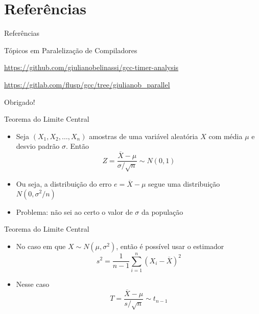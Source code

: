 \section{Referências}

\begin{frame}[allowframebreaks]{Referências}
  \printbibliography
\end{frame}

\begin{frame}{Tópicos em Paralelização de Compiladores}
  \overview

  {%
    \centering\noindent%
    \url{https://github.com/giulianobelinassi/gcc-timer-analysis}\par
    \url{https://gitlab.com/flusp/gcc/tree/giulianob\_parallel}\par
  }

\end{frame}

\begin{frame}[standout]
    Obrigado!
\end{frame}

\appendix

\begin{frame}{Teorema do Limite Central}
    \begin{itemize}
        \item Seja $(X_1, X_2, \dots, X_n)$ amostras de uma variável aleatória $X$ com média
            $\mu$ e desvio padrão $\sigma$. Então
            $$ Z = \frac{\overline{X} - \mu}{\sigma / \sqrt{n}} \sim N(0, 1)$$
        \item Ou seja, a distribuição do erro $e = \overline{X} - \mu$ segue uma distribuição $N(0, \sigma^2/n)$
        \item Problema: não sei ao certo o valor de $\sigma$ da população
    \end{itemize}
\end{frame}

\begin{frame}{Teorema do Limite Central}
    \begin{itemize}
        \item No caso em que $X \sim N(\mu, \sigma^2)$, então é possível usar o estimador
            $$s^2 = \frac{1}{n-1}\sum_{i=1}^n (X_i - \overline{X})^2$$
        \item Nesse caso
            $$ T = \frac{\overline{X} - \mu}{s / \sqrt{n}} \sim t_{n-1}$$
    \end{itemize}
\end{frame}


